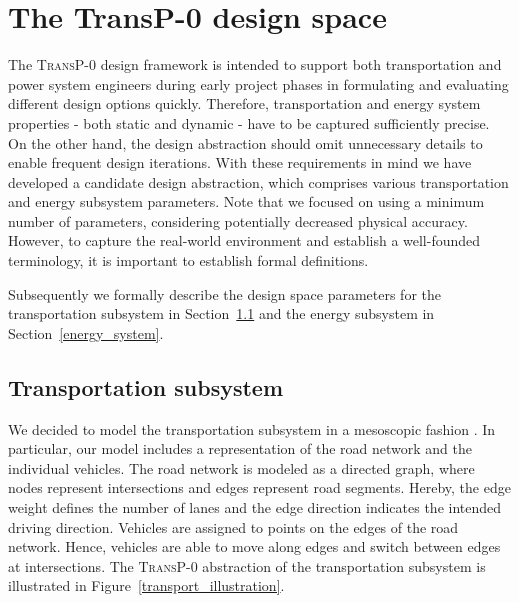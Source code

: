 \section{The \textbf{TransP-0} design space}
\label{proposed_model}
The \textsc{TransP-0} design framework is intended to support both transportation and power system engineers
during early project phases 
in formulating and evaluating different design options quickly. Therefore, transportation and energy system properties - both static and dynamic - have to be captured sufficiently precise. On the other hand, the design abstraction should omit unnecessary details to enable frequent design iterations. With these requirements in mind we have developed a candidate design abstraction, which comprises various transportation and energy subsystem parameters. Note that we focused on using a minimum number of parameters, considering potentially decreased physical accuracy. However, to capture the real-world environment and establish a well-founded terminology, it is important to establish formal definitions.


Subsequently we formally describe the design space parameters for the transportation subsystem in Section~\ref{transport} and the energy subsystem in Section~\ref{energy_system}.

\subsection{Transportation subsystem}
\label{transport}

We decided to model the transportation subsystem in a mesoscopic fashion \cite{burghout2005mesoscopic}. In particular, our model includes a representation of the road network and the individual vehicles. The road network is modeled as a directed graph, where nodes represent intersections and edges represent road segments. Hereby, the edge weight defines the number of lanes and the edge direction indicates the intended driving direction.
Vehicles are assigned to points on the edges of the road network. Hence, vehicles are able to move along edges and switch between edges at intersections. The \textsc{TransP-0} abstraction of the transportation subsystem is illustrated in Figure~\ref{transport_illustration}.

